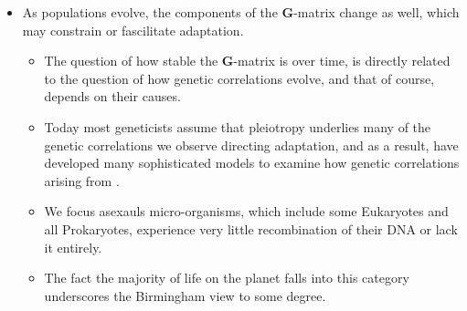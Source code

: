 \documentclass[11pt,one column]{article}
\begin{document}
\begin{itemize}
\item As populations evolve, the components of the \textbf{G}-matrix change as well, which may constrain or fascilitate adaptation.
\begin{itemize}
\item The question of how stable the \textbf{G}-matrix is over time, is directly related to the question of how genetic correlations evolve, and that of course, depends on their causes.
\item Today most geneticists assume that pleiotropy underlies many of the genetic correlations we observe directing adaptation, and as a result, have developed many sophisticated models to examine how genetic correlations arising from .
\item We focus asexauls micro-organisms, which include some Eukaryotes and all Prokaryotes, experience very little recombination of their DNA or lack it entirely.	
\item The fact the majority of life on the planet falls into this category underscores the Birmingham view to some degree.
\end{itemize}


\end{itemize}
\end{document}
